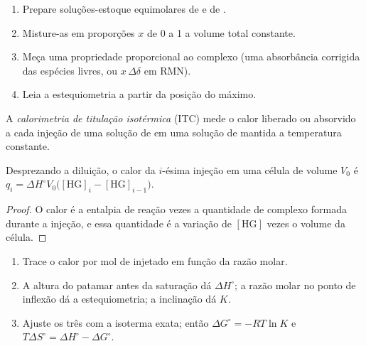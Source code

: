 \begin{method}\label{met:b3:supramolecular:job}
\begin{enumerate}
  \item Prepare soluções-estoque equimolares de  e de .
  \item Misture-as em proporções $x$ de 0 a 1 a volume total constante.
  \item Meça uma propriedade proporcional ao complexo (uma absorbância corrigida
        das espécies livres, ou $x\,\Delta\delta$ em RMN).
  \item Leia a estequiometria a partir da posição do máximo.
\end{enumerate}
\end{method}

\begin{definition}\label{def:b3:supramolecular:itc}
A \emph{calorimetria de titulação isotérmica}
(ITC) mede o calor liberado ou absorvido a cada injeção de uma solução de 
em uma solução de  mantida a temperatura constante.
\end{definition}

\begin{proposition}\label{prop:b3:supramolecular:itc}
Desprezando a diluição, o calor da $i$-ésima injeção em uma célula de volume $V_0$ é
$q_i = \Delta H^\circ V_0\bigl([\mathrm{HG}]_i - [\mathrm{HG}]_{i-1}\bigr)$.
\end{proposition}

\begin{proof}
O calor é a entalpia de reação vezes a quantidade de complexo formada durante a
injeção, e essa quantidade é a variação de $[\mathrm{HG}]$ vezes o volume da célula.
\end{proof}

\begin{method}\label{met:b3:supramolecular:itc}
\begin{enumerate}
  \item Trace o calor por mol de  injetado em função da razão molar.
  \item A altura do patamar antes da saturação dá $\Delta H^\circ$; a razão molar no
        ponto de inflexão dá a estequiometria; a inclinação dá $K$.
  \item Ajuste os três com a isoterma exata; então $\Delta G^\circ = -RT\ln K$ e
        $T\Delta S^\circ = \Delta H^\circ - \Delta G^\circ$.
\end{enumerate}
\end{method}

